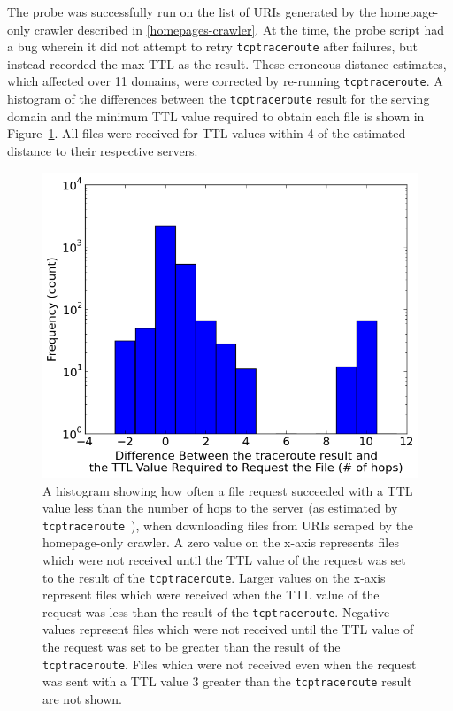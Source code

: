 The probe was successfully run on the list of URIs generated by the homepage-only crawler described in \autoref{homepages-crawler}.
At the time, the probe script had a bug wherein it did not attempt to retry \texttt{tcptraceroute} after failures, but instead recorded the max TTL as the result.
These erroneous distance estimates, which affected over 11 domains, were corrected by re-running \texttt{tcptraceroute}.
A histogram of the differences between the \texttt{tcptraceroute} result for the serving domain and the minimum TTL value required to obtain each file is shown in Figure~\ref{fig_histhomepages}.
All files were received for TTL values within 4 of the estimated distance to their respective servers.
\begin{figure}
	\includegraphics[width=\columnwidth]{figures/histhomepages}
	\caption{
		A histogram showing how often a file request succeeded with a TTL value less than the number of hops to the server (as estimated by \texttt{tcptraceroute}~\cite{Toren2006}), when downloading files from URIs scraped by the homepage-only crawler.
		A zero value on the x-axis represents files which were not received until the TTL value of the request was set to the result of the \texttt{tcptraceroute}.
		Larger values on the x-axis represent files which were received when the TTL value of the request was less than the result of the \texttt{tcptraceroute}.
		Negative values represent files which were not received until the TTL value of the request was set to be greater than the result of the \texttt{tcptraceroute}.
		Files which were not received even when the request was sent with a TTL value 3 greater than the \texttt{tcptraceroute} result are not shown.
	}
	\label{fig_histhomepages}
\end{figure}

